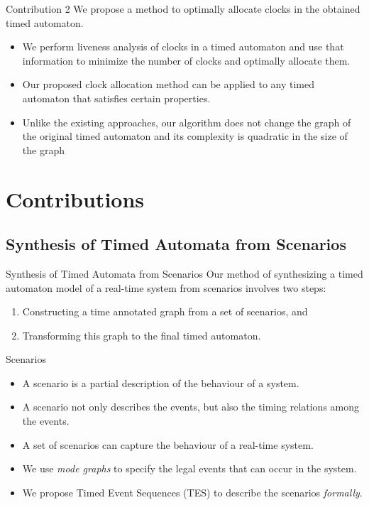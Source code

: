 \documentclass[10pt]{beamer}
\theoremstyle{plain}
\theoremstyle{definition}
\begin{document}
\begin{frame}{Contribution 2}
	\alert{We propose a method to optimally allocate clocks in the obtained timed automaton.}
	\begin{itemize}
		\item We perform liveness analysis of clocks in a timed automaton and use that information to minimize the number of clocks and optimally allocate them.
		\item Our proposed clock allocation method can be applied to any timed automaton that satisfies certain properties.
		\item Unlike the existing approaches, our algorithm does not change the graph of the original timed automaton and its complexity is quadratic in the size of the graph
	\end{itemize}
\end{frame}

\section{Contributions}
\subsection{Synthesis of Timed Automata from Scenarios}

\begin{frame}{Synthesis of Timed Automata from Scenarios}
Our method of synthesizing a timed automaton model of a real-time system from scenarios involves two steps:
	\begin{enumerate}
		\item Constructing a time annotated graph from a set of scenarios, and
		\item Transforming this graph to the final timed automaton.
	\end{enumerate}
\end{frame}

\begin{frame}{%
	Scenarios}
	\begin{itemize}
		\item A scenario is a partial description of the behaviour of a system.
		\item A scenario not only describes the events, but also the timing relations among the events.
		\item A set of scenarios can capture the behaviour of a real-time system.
		
		\item We use \emph{mode graphs} to specify the legal events that can occur in the system.
		\item We propose Timed Event Sequences (TES) to describe the scenarios \emph{formally}.
	\end{itemize}	
\end{frame}
\end{document}
